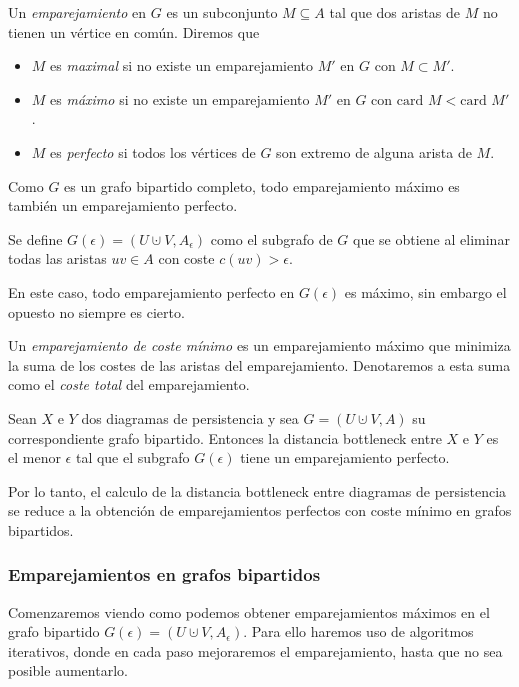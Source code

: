 \begin{definition}
Un \emph{emparejamiento} en $G$ es un subconjunto $M \subseteq A$ tal que dos aristas de $M$ no tienen un vértice en común. Diremos que
\begin{itemize}
	\item $M$ es \emph{maximal} si no existe un emparejamiento $M'$ en $G$ con $M \subset M'$.
	\item $M$ es \emph{máximo} si no existe un emparejamiento $M'$ en $G$ con $\text{card } M < \text{card } M'$.
	\item $M$ es \emph{perfecto} si todos los vértices de $G$ son extremo de alguna arista de $M$.
\end{itemize}
\end{definition}

Como $G$ es un grafo bipartido completo, todo emparejamiento máximo es también un emparejamiento perfecto.

\begin{definition}
Se define $G(\epsilon)=(U \cupdot V, A_\epsilon)$ como el subgrafo de $G$ que se obtiene al eliminar todas las aristas $uv \in A$ con coste $c(uv)>\epsilon$.  
\end{definition}
En este caso, todo emparejamiento perfecto en $G(\epsilon)$ es máximo, sin embargo el opuesto no siempre es cierto.

\begin{definition}
Un \emph{emparejamiento de coste mínimo} es un emparejamiento máximo que minimiza la suma de los costes de las aristas del emparejamiento. Denotaremos a esta suma como el \emph{coste total} del emparejamiento.
\end{definition}

\begin{lemma}
Sean $X$ e $Y$ dos diagramas de persistencia y sea $G =(U \cupdot V, A)$ su correspondiente grafo bipartido. Entonces la distancia bottleneck entre $X$ e $Y$ es el menor $\epsilon$ tal que el subgrafo $G(\epsilon)$ tiene un emparejamiento perfecto.
\end{lemma}

Por lo tanto, el calculo de la distancia bottleneck entre diagramas de persistencia se reduce a la obtención de emparejamientos perfectos con coste mínimo en grafos bipartidos.

\subsubsection*{Emparejamientos en grafos bipartidos}
Comenzaremos viendo como podemos obtener emparejamientos máximos en el grafo bipartido $G(\epsilon)=(U \cupdot V, A_\epsilon)$. Para ello haremos uso de algoritmos iterativos, donde en cada paso mejoraremos el emparejamiento, hasta que no sea posible aumentarlo.

